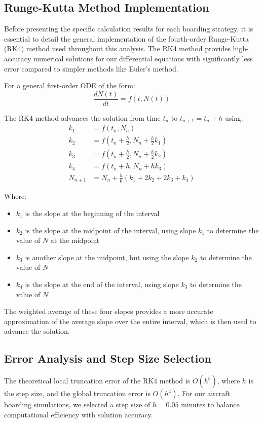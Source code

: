 
\subsection{Runge-Kutta Method Implementation}
Before presenting the specific calculation results for each boarding strategy, it is essential to detail the general implementation of the fourth-order Runge-Kutta (RK4) method used throughout this analysis. The RK4 method provides high-accuracy numerical solutions for our differential equations with significantly less error compared to simpler methods like Euler's method.

For a general first-order ODE of the form:
\begin{equation}
\frac{dN(t)}{dt} = f(t, N(t))
\end{equation}

The RK4 method advances the solution from time $t_n$ to $t_{n+1} = t_n + h$ using:
\begin{align}
k_1 &= f(t_n, N_n) \\
k_2 &= f\left(t_n + \frac{h}{2}, N_n + \frac{h}{2}k_1\right) \\
k_3 &= f\left(t_n + \frac{h}{2}, N_n + \frac{h}{2}k_2\right) \\
k_4 &= f(t_n + h, N_n + hk_3) \\
N_{n+1} &= N_n + \frac{h}{6}(k_1 + 2k_2 + 2k_3 + k_4)
\end{align}

Where:
\begin{itemize}
    \item $k_1$ is the slope at the beginning of the interval
    \item $k_2$ is the slope at the midpoint of the interval, using slope $k_1$ to determine the value of $N$ at the midpoint
    \item $k_3$ is another slope at the midpoint, but using the slope $k_2$ to determine the value of $N$
    \item $k_4$ is the slope at the end of the interval, using slope $k_3$ to determine the value of $N$
\end{itemize}

The weighted average of these four slopes provides a more accurate approximation of the average slope over the entire interval, which is then used to advance the solution.

\subsection{Error Analysis and Step Size Selection}
The theoretical local truncation error of the RK4 method is $O(h^5)$, where $h$ is the step size, and the global truncation error is $O(h^4)$. For our aircraft boarding simulations, we selected a step size of $h = 0.05$ minutes to balance computational efficiency with solution accuracy.

